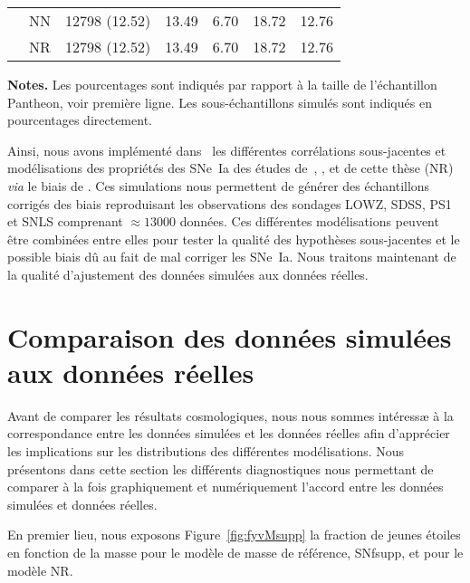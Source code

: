 \documentclass[../main/main.tex]{subfiles}
\begin{document}
\begin{table}[ht]
\begin{threeparttable}
{\begin{tabular}{ccccccc}
            & NN & 12798 (12.52) & 13.49 & 6.70 & 18.72 & 12.76 \\
            & NR & 12798 (12.52) & 13.49 & 6.70 & 18.72 & 12.76 \\
            \bottomrule
    \end{tabular}}
        \begin{tablenotes}[flushleft]
            \item \small \textbf{\hspace{-3,2pt}Notes.} Les pourcentages
                sont indiqués par rapport à la taille de l'échantillon
                Pantheon, voir première ligne. Les sous-échantillons simulés
                sont indiqués en pourcentages directement.
        \end{tablenotes}
    \end{threeparttable}
\end{table}


Ainsi, nous avons implémenté dans \snana\ les différentes corrélations
sous-jacentes et modélisations des propriétés des SNe~Ia des études
de~, , 
et de cette thèse (NR) \textit{via} le biais de \hostlib. Ces simulations nous
permettent de générer des échantillons corrigés des biais reproduisant les
observations des sondages LOWZ, SDSS, PS1 et SNLS comprenant $\approx
\num{13000}$ données. Ces différentes modélisations peuvent être combinées entre
elles pour tester la qualité des hypothèses sous-jacentes et le possible biais
dû au fait de mal corriger les SNe~Ia. Nous traitons maintenant de la qualité
d'ajustement des données simulées aux données réelles.

\section{Comparaison des données simulées aux données réelles}\label{sec:simcomp}

Avant de comparer les résultats cosmologiques, nous nous sommes intéressæ à la
correspondance entre les données simulées et les données réelles afin
d'apprécier les implications sur les distributions des différentes
modélisations. Nous présentons dans cette section les différents diagnostiques
nous permettant de comparer à la fois graphiquement et numériquement l'accord
entre les données simulées et données réelles.

En premier lieu, nous exposons Figure~\ref{fig:fyvMsupp} la fraction de jeunes
étoiles en fonction de la masse pour le modèle de masse de référence, SNfsupp,
et pour le modèle NR.
\end{document}
